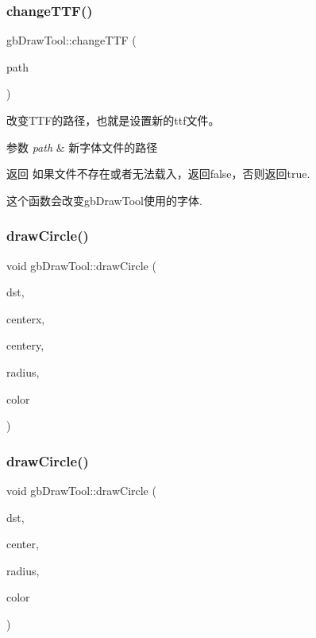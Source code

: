 \subsubsection{\texorpdfstring{changeTTF()}{changeTTF()}}
{\footnotesize\ttfamily gb\+Draw\+Tool\+::change\+T\+TF (\begin{DoxyParamCaption}\item[{const string}]{path }\end{DoxyParamCaption})}



改变\+T\+T\+F的路径，也就是设置新的ttf文件。 


\begin{DoxyParams}{参数}
{\em path} & 新字体文件的路径 \\
\hline
\end{DoxyParams}
\begin{DoxyReturn}{返回}
如果文件不存在或者无法载入，返回false，否则返回true.
\end{DoxyReturn}
这个函数会改变gb\+Draw\+Tool使用的字体. \mbox{\label{classgb_draw_tool_afa5a1ca83a9de5647a018a2532441689}} 
\subsubsection{\texorpdfstring{drawCircle()}{drawCircle()}\hspace{0.1cm}{\footnotesize\ttfamily [1/2]}}
{\footnotesize\ttfamily void gb\+Draw\+Tool\+::draw\+Circle (\begin{DoxyParamCaption}\item[{S\+D\+L\+\_\+\+Texture $\ast$}]{dst,  }\item[{int}]{centerx,  }\item[{int}]{centery,  }\item[{int}]{radius,  }\item[{\mbox{\hyperlink{classgb_color}{gb\+Color}}}]{color }\end{DoxyParamCaption})}

\mbox{\label{classgb_draw_tool_a57917a678517b8441ac9a44d71a03ec7}} 
\subsubsection{\texorpdfstring{drawCircle()}{drawCircle()}\hspace{0.1cm}{\footnotesize\ttfamily [2/2]}}
{\footnotesize\ttfamily void gb\+Draw\+Tool\+::draw\+Circle (\begin{DoxyParamCaption}\item[{S\+D\+L\+\_\+\+Texture $\ast$}]{dst,  }\item[{\mbox{\hyperlink{classgb_point}{gb\+Point}}}]{center,  }\item[{int}]{radius,  }\item[{\mbox{\hyperlink{classgb_color}{gb\+Color}}}]{color }\end{DoxyParamCaption})}

